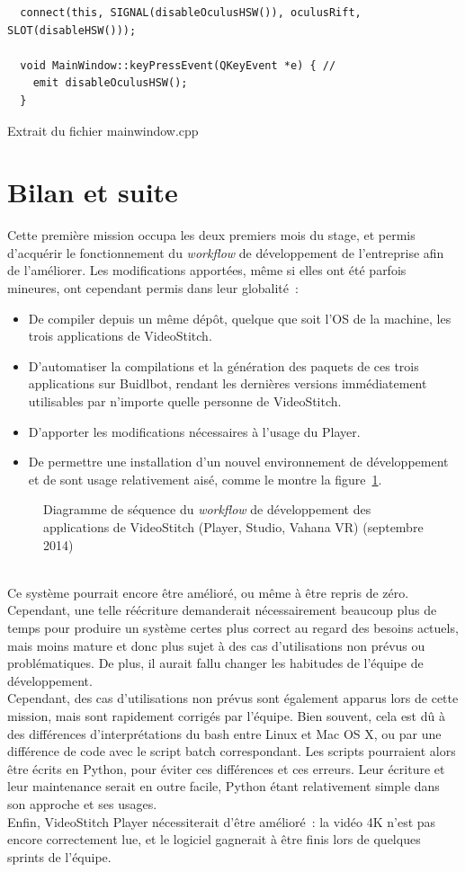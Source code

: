 \begin{listing}
  \begin{verbatim}
  connect(this, SIGNAL(disableOculusHSW()), oculusRift, SLOT(disableHSW()));
  
  void MainWindow::keyPressEvent(QKeyEvent *e) { // 
    emit disableOculusHSW();
  }
  \end{verbatim}
  \caption{Extrait du fichier mainwindow.cpp}
  \label{player-mainwindow}
\end{listing}


\section{Bilan et suite}
Cette première mission occupa les deux premiers mois du stage, et permis d'acquérir
le fonctionnement du \textit{workflow} de développement de l'entreprise afin de l'améliorer.
Les modifications apportées, même si elles ont été parfois mineures, ont cependant permis dans leur globalité~:
\begin{itemize}
 \item De compiler depuis un même dépôt, quelque que soit l'OS de la machine, les trois applications de VideoStitch.
 \item D'automatiser la compilations et la génération des paquets de ces trois applications 
 sur Buidlbot, rendant les dernières versions immédiatement utilisables par n'importe 
 quelle personne de VideoStitch.
 \item D'apporter les modifications nécessaires à l'usage du Player.
 \item De permettre une installation d'un nouvel environnement de développement et
 de sont usage relativement aisé, comme le montre la figure~\ref{workflow-final}.
\end{itemize}
\begin{figure}
  \centering
  \caption{Diagramme de séquence du \textit{workflow} de développement des applications de VideoStitch (Player, Studio, Vahana VR) (septembre 2014)}
	\label{workflow-final}
\end{figure}
\ \\
Ce système pourrait encore être amélioré, ou même à être repris de zéro. Cependant, 
une telle réécriture demanderait nécessairement beaucoup plus de temps pour
produire un système certes plus correct au regard des besoins actuels, mais moins mature
et donc plus sujet à des cas d'utilisations non prévus ou problématiques. De plus,
il aurait fallu changer les habitudes de l'équipe de développement.\\
Cependant, des cas d'utilisations non prévus sont également apparus lors de cette mission,
mais sont rapidement corrigés par l'équipe. Bien souvent, cela est dû à des différences
d'interprétations du bash entre Linux et Mac OS X, ou par une différence de code avec
le script batch correspondant. Les scripts pourraient alors être écrits en Python, pour
éviter ces différences et ces erreurs. Leur écriture et leur maintenance serait 
en outre facile, Python étant relativement simple dans son approche et ses usages.\\
Enfin, VideoStitch Player nécessiterait d'être amélioré~: la vidéo
4K n'est pas encore correctement lue, et le logiciel gagnerait à être finis lors
de quelques sprints de l'équipe.
